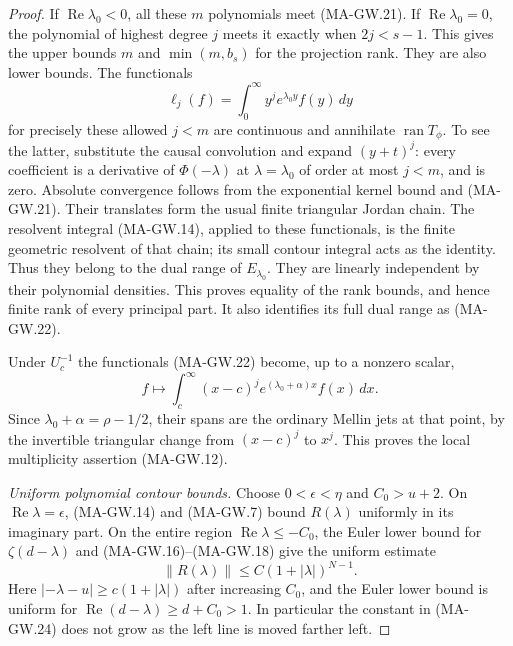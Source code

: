 \begin{proof}
If $\operatorname{Re}\lambda_0<0$, all these $m$
polynomials meet (MA-GW.21).
If $\operatorname{Re}\lambda_0=0$, the polynomial of
highest degree $j$ meets it exactly when $2j<s-1$.
This gives the upper bounds $m$ and $\min(m,b_s)$
for the projection rank.
They are also lower bounds.
The functionals
\[
                         \ell_j(f)=\int_0^\infty
                                      y^j e^{\lambda_0y}f(y)\,dy
 \tag{MA-GW.22}
\]
for precisely these allowed $j<m$ are continuous and
annihilate $\operatorname{ran}T_\phi$.
To see the latter, substitute the causal convolution
and expand $(y+t)^j$: every coefficient is a derivative
of $\Phi(-\lambda)$ at $\lambda=\lambda_0$ of order
at most $j<m$, and is zero.
Absolute convergence follows from the exponential
kernel bound and (MA-GW.21).
Their translates form the usual finite triangular
Jordan chain.  The resolvent integral (MA-GW.14),
applied to these functionals, is the finite geometric
resolvent of that chain; its small contour integral
acts as the identity.  Thus they belong to the dual
range of $E_{\lambda_0}$.
They are linearly independent by their polynomial
densities.  This proves equality of the rank bounds,
and hence finite rank of every principal part.
It also identifies its full dual range as (MA-GW.22).

Under $U_c^{-1}$ the functionals (MA-GW.22) become,
up to a nonzero scalar,
\[
              f\longmapsto\int_c^\infty
                     (x-c)^j e^{(\lambda_0+\alpha)x}f(x)\,dx .
 \tag{MA-GW.23}
\]
Since $\lambda_0+\alpha=\rho-1/2$, their spans are
the ordinary Mellin jets at that point, by the
invertible triangular change from $(x-c)^j$ to $x^j$.
This proves the local multiplicity assertion (MA-GW.12).

\emph{Uniform polynomial contour bounds.}
Choose $0<\epsilon<\eta$ and $C_0>u+2$.
On $\operatorname{Re}\lambda=\epsilon$,
(MA-GW.14) and (MA-GW.7) bound $R(\lambda)$ uniformly
in its imaginary part.
On the entire region $\operatorname{Re}\lambda\le-C_0$,
the Euler lower bound for $\zeta(d-\lambda)$ and
(MA-GW.16)--(MA-GW.18) give the uniform estimate
\[
                 \|R(\lambda)\|\le C(1+|\lambda|)^{N-1}.
 \tag{MA-GW.24}
\]
Here $|-\lambda-u|\ge c(1+|\lambda|)$ after increasing
$C_0$, and the Euler lower bound is uniform for
$\operatorname{Re}(d-\lambda)\ge d+C_0>1$.
In particular the constant in (MA-GW.24) does not grow
as the left line is moved farther left.


\end{proof}

